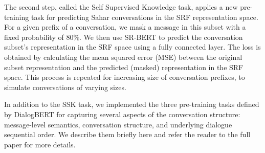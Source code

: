 \documentclass[letterpaper]{article} %
\begin{document}
The second step, called   the Self Supervised Knowledge task, applies a new pre-training task  for predicting  Sahar conversations in the SRF representation space.
For  a given  prefix of a conversation, we  mask a message in this subset  with a fixed probability of 80\%.
We then use SR-BERT to predict the conversation subset's representation in the SRF space using a fully connected layer.
The loss is obtained by calculating the mean squared error (MSE)
between the original subset representation and the predicted (masked) representation in the SRF space.
This process is repeated for increasing size of conversation prefixes, to simulate conversations of varying sizes.



In addition to the SSK task, we implemented  the  three pre-training tasks defined by DialogBERT\cite{gu2021dialogbert} for capturing several aspects of the conversation structure: message-level semantics, conversation structure, and underlying dialogue sequential order. We describe them briefly here and refer the reader to the full paper for more details.
\end{document}

